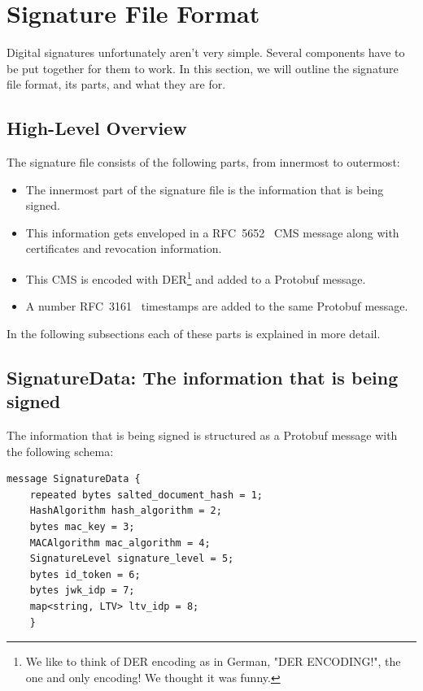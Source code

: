 \section{Signature File Format}\label{sec:signature-file-format}
Digital signatures unfortunately aren't very simple.
Several components have to be put together for them to work.
In this section, we will outline the signature file format,
its parts,
and what they are for.

\subsection{High-Level Overview}\label{subsec:high-level-overview}
The signature file consists of the following parts, from innermost to outermost:

\begin{itemize}
    \item The innermost part of the signature file is the information that is being signed.
    \item This information gets enveloped in a RFC~5652~\cite{rfc5652} \gls{CMS} message along with certificates and revocation information.
    \item This \gls{CMS} is encoded with \gls{DER}\footnote{We like to think of DER encoding as in German, "DER ENCODING!", the one and only encoding! We thought it was funny.} and added to a Protobuf message.
    \item A number RFC~3161~\cite{rfc3161} timestamps are added to the same Protobuf message.
\end{itemize}

In the following subsections each of these parts is explained in more detail.

\subsection{SignatureData: The information that is being signed}\label{subsec:signaturedata:-the-information-that-is-being-signed}
The information that is being signed is structured as a Protobuf message with the following schema:

\begin{lstlisting}[caption={SignatureData schema}, captionpos=b, label={lst:signaturedataschema}]
    message SignatureData {
    repeated bytes salted_document_hash = 1;
    HashAlgorithm hash_algorithm = 2;
    bytes mac_key = 3;
    MACAlgorithm mac_algorithm = 4;
    SignatureLevel signature_level = 5;
    bytes id_token = 6;
    bytes jwk_idp = 7;
    map<string, LTV> ltv_idp = 8;
    }
\end{lstlisting}

